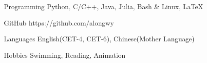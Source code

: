 

\vspace{-1.5mm}
\begin{cvskills}


\cvskill
{Programming} %
{Python, C/C++, Java, Julia, Bash \& Linux, \LaTeX} %


\cvskill
{GitHub} %
{https://github.com/alongwy} %


\cvskill
{Languages} %
{English(CET-4, CET-6), Chinese(Mother Language)} %

\cvskill
{Hobbies} %
{Swimming, Reading, Animation} %

\end{cvskills}